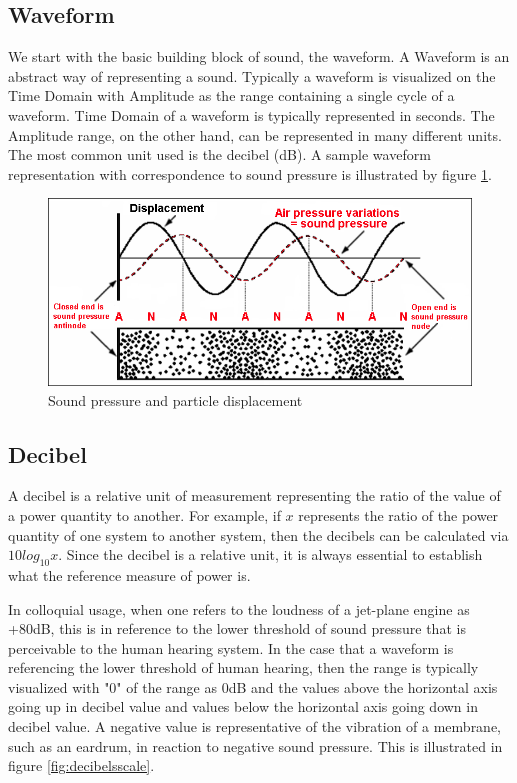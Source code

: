 \documentclass[a4paper,12pt]{report}
\begin{document}
\subsection{Waveform}
\label{subsec:waveform}
We start with the basic building block of sound, the waveform. A Waveform is an abstract way of representing a sound. Typically a waveform is visualized on the Time Domain with Amplitude as the range containing a single cycle of a waveform. Time Domain of a waveform is typically represented in seconds. The Amplitude range, on the other hand, can be represented in many different units. The most common unit used is the decibel (dB). A sample waveform representation with correspondence to sound pressure is illustrated by figure \ref{fig:particledisplacementsoundpressure}.

\begin{figure}
    \centering
    \includegraphics[width=32em]{ParticleDisplacement-SoundPressure-Node-Antinode.png}
    \caption{Sound pressure and particle displacement}
    \label{fig:particledisplacementsoundpressure}
\end{figure}

\subsection{Decibel}
\label{subsec:decibel}
A decibel is a relative unit of measurement representing the ratio of the value of a power quantity to another. For example, if $x$ represents the ratio of the power quantity of one system to another system, then the decibels can be calculated via $10 log_10 x$. Since the decibel is a relative unit, it is always essential to establish what the reference measure of power is. 

In colloquial usage, when one refers to the loudness of a jet-plane engine as +80dB, this is in reference to the lower threshold of sound pressure that is perceivable to the human hearing system. In the case that a waveform is referencing the lower threshold of human hearing, then the range is typically visualized with "0" of the range as 0dB and the values above the horizontal axis going up in decibel value and values below the horizontal axis going down in decibel value. A negative value is representative of the vibration of a membrane, such as an eardrum, in reaction to negative sound pressure. This is illustrated in figure \ref{fig:decibelsscale}.
\end{document}
